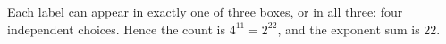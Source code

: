 Each label can appear in exactly one of three boxes, or in all three: four independent choices. Hence the count is $4^{11}=2^{22}$, and the exponent sum is $\boxed{22}$.
